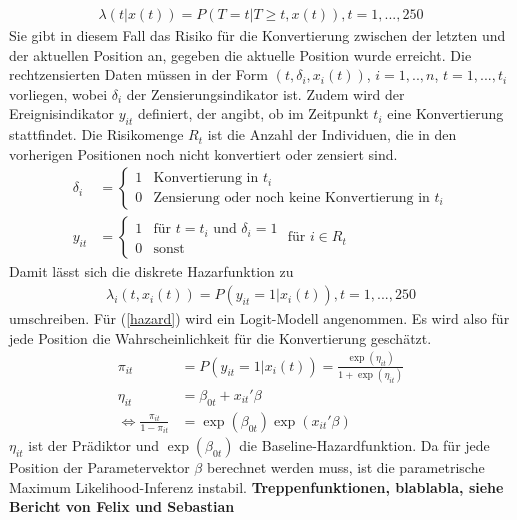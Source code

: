 \begin{align}
	\lambda(t|x(t)) = P(T=t|T\geq t, x(t)), t=1,...,250
\end{align}
Sie gibt in diesem Fall das Risiko für die Konvertierung zwischen der letzten und der aktuellen Position an, gegeben die aktuelle Position wurde erreicht. Die rechtzensierten Daten müssen in der Form $(t, \delta_i, x_i(t))$, $i = 1,..,n$, $t=1,...,t_i$ vorliegen, wobei $\delta_i$ der Zensierungsindikator ist. Zudem wird der Ereignisindikator $y_{it}$ definiert, der angibt, ob im Zeitpunkt $t_i$ eine Konvertierung stattfindet. Die Risikomenge $R_t$ ist die Anzahl der Individuen, die in den vorherigen Positionen noch nicht konvertiert oder zensiert sind.
\begin{align}
	\delta_i &= \begin{cases} 1 & \text{Konvertierung in } t_i\\
														 0 & \text{Zensierung oder noch keine Konvertierung in } t_i
	\end{cases}\\
	y_{it} &= \begin{cases} 1 & \text{für $t=t_i$ und $\delta_i=1$}\\
														 0 & \text{sonst}
	\end{cases} \text{ für } i \in R_t
\end{align}
Damit lässt sich die diskrete Hazarfunktion zu
\begin{align}
	\lambda_i(t,x_i(t)) = P(y_{it}=1|x_i(t)), t=1,...,250 \label{hazard}
\end{align}
umschreiben. Für (\ref{hazard}) wird ein Logit-Modell angenommen. Es wird also für jede Position die Wahrscheinlichkeit für die Konvertierung geschätzt.
\begin{align}
	\pi_{it}&=P(y_{it}=1|x_i(t)) = \frac{\exp(\eta_{it})}{1+\exp(\eta_{it})}\\
	\eta_{it} &= \beta_{0t} + x_{it}'\beta\\
	\Leftrightarrow \frac{\pi_{it}}{1-\pi_{it}} &= \exp(\beta_{0t})\exp(x_{it}'\beta)
\end{align}
$\eta_{it}$ ist der Prädiktor und $\exp(\beta_{0t})$ die Baseline-Hazardfunktion. Da für jede Position der Parametervektor $\beta$ berechnet werden muss, ist die parametrische Maximum Likelihood-Inferenz instabil. \textbf{Treppenfunktionen, blablabla, siehe Bericht von Felix und Sebastian}

